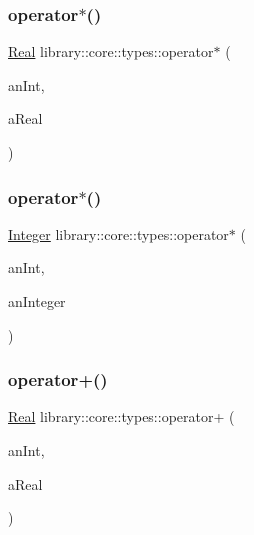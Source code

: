 \subsubsection{\texorpdfstring{operator$\ast$()}{operator*()}\hspace{0.1cm}{\footnotesize\ttfamily [1/2]}}
{\footnotesize\ttfamily \hyperlink{classlibrary_1_1core_1_1types_1_1_real}{Real} library\+::core\+::types\+::operator$\ast$ (\begin{DoxyParamCaption}\item[{const \hyperlink{classlibrary_1_1core_1_1types_1_1_real_a9c5c8826b7e5a8e39544d23fea6c0e1c}{Real\+::\+Value\+Type} \&}]{an\+Int,  }\item[{const \hyperlink{classlibrary_1_1core_1_1types_1_1_real}{Real} \&}]{a\+Real }\end{DoxyParamCaption})}

\mbox{\label{namespacelibrary_1_1core_1_1types_abc5a3a409f7959b3f0130b2cbb7c3310}} 
\subsubsection{\texorpdfstring{operator$\ast$()}{operator*()}\hspace{0.1cm}{\footnotesize\ttfamily [2/2]}}
{\footnotesize\ttfamily \hyperlink{classlibrary_1_1core_1_1types_1_1_integer}{Integer} library\+::core\+::types\+::operator$\ast$ (\begin{DoxyParamCaption}\item[{const \hyperlink{classlibrary_1_1core_1_1types_1_1_integer_a623afb1580f870fd8a1997b1c12c917d}{Integer\+::\+Value\+Type} \&}]{an\+Int,  }\item[{const \hyperlink{classlibrary_1_1core_1_1types_1_1_integer}{Integer} \&}]{an\+Integer }\end{DoxyParamCaption})}

\mbox{\label{namespacelibrary_1_1core_1_1types_a6866c9236ccc6c22dd6d30e9b64d5aba}} 
\subsubsection{\texorpdfstring{operator+()}{operator+()}\hspace{0.1cm}{\footnotesize\ttfamily [1/2]}}
{\footnotesize\ttfamily \hyperlink{classlibrary_1_1core_1_1types_1_1_real}{Real} library\+::core\+::types\+::operator+ (\begin{DoxyParamCaption}\item[{const \hyperlink{classlibrary_1_1core_1_1types_1_1_real_a9c5c8826b7e5a8e39544d23fea6c0e1c}{Real\+::\+Value\+Type} \&}]{an\+Int,  }\item[{const \hyperlink{classlibrary_1_1core_1_1types_1_1_real}{Real} \&}]{a\+Real }\end{DoxyParamCaption})}

